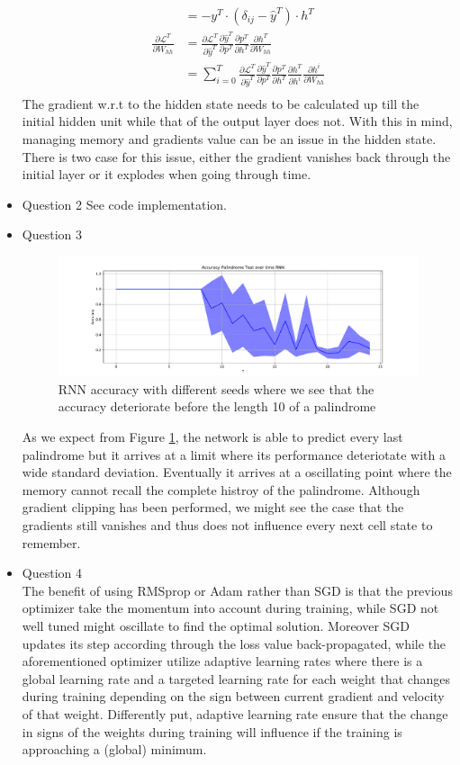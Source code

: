 \documentclass{article}
\begin{document}
\begin{itemize}
\begin{align*}
      &= - y^T \cdot \left(\delta_{ij} - \hat{y}^T \right) \cdot h^T \\
      \frac{\partial \mathcal{L}^T}{\partial W_{hh}} &= \frac{\partial\mathcal{L}^T}{\partial \hat{y}^T} \frac{\partial \hat{y}^T}{\partial p^T}  \frac{\partial p^T}{\partial h^T} \frac{\partial h^T}{\partial W_{hh}} \\
      &= \sum_{i = 0}^{T}\frac{\partial\mathcal{L}^T}{\partial \hat{y}^T} \frac{\partial \hat{y}^T}{\partial p^T}  \frac{\partial p^T}{\partial h^T} \frac{\partial h^T}{\partial h^i} \frac{\partial h^i}{\partial W_{hh}} \\
    \end{align*}
    The gradient w.r.t to the hidden state needs to be calculated up till the initial hidden unit while that of the output layer does not. With this in mind, managing memory and gradients value can be an issue in the hidden state. There is two case for this issue, either the gradient vanishes back through the initial layer or it explodes when going through time. 
    \item Question 2 See code implementation. 
    \item Question 3
    \begin{figure}[H]
      \includegraphics[width=\linewidth]{RNN_acc_.pdf}
      \caption{RNN accuracy with different seeds where we see that the accuracy deteriorate before the length 10 of a palindrome}
      \label{fig:rnn_acc}
    \end{figure}
  As we expect from Figure \ref{fig:rnn_acc}, the network is able to predict every last palindrome but it arrives at a limit where its performance deteriotate with a wide standard deviation. Eventually it arrives at a oscillating point where the memory cannot recall the complete histroy of the palindrome. Although gradient clipping has been performed, we might see the case that the gradients still vanishes and thus does not influence every next cell state to remember. 
    \item Question 4 \\
    The benefit of using RMSprop or Adam rather than SGD is that the previous optimizer take the momentum into account during training, while SGD not well tuned might oscillate to find the optimal solution. Moreover SGD updates its step according through the loss value  back-propagated, while the aforementioned optimizer utilize adaptive learning rates where there is a global learning rate and a targeted learning rate for each weight that changes during training depending on the sign between current gradient and velocity of that weight. Differently put, adaptive learning rate ensure that the change in signs of the weights during training will influence if the training is approaching a (global) minimum.  
\end{itemize}
\end{document}
